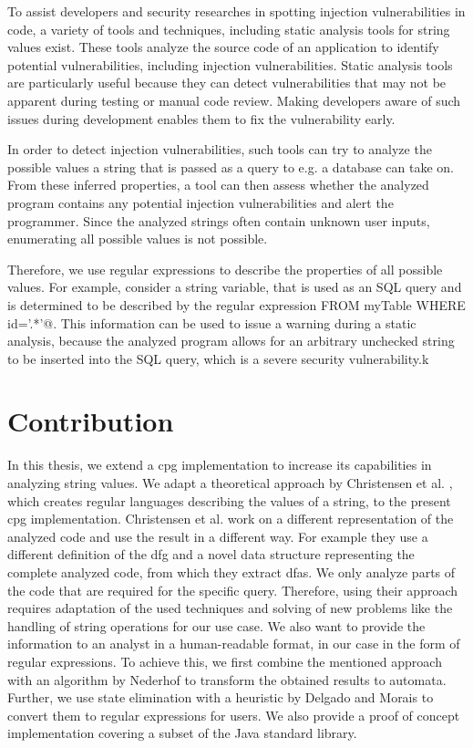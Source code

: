 To assist developers and security researches in spotting injection vulnerabilities in code, a variety of tools and techniques, including static analysis tools for string values exist. These tools analyze the source code of an application to identify potential vulnerabilities, including injection vulnerabilities. Static analysis tools are particularly useful because they can detect vulnerabilities that may not be apparent during testing or manual code review. Making developers aware of such issues during development enables them to fix the vulnerability early.

In order to detect injection vulnerabilities, such tools can try to analyze the possible values a string that is passed as a query to e.g. a database can take on.
From these inferred properties, a tool can then assess whether the analyzed program contains any potential injection vulnerabilities and alert the programmer.
Since the analyzed strings often contain unknown user inputs, enumerating all possible values is not possible. 

Therefore, we use regular expressions to describe the properties of all possible values.
For example, consider a string variable, that is used as an SQL query and is determined to be described by the regular expression \Verb@DELETE \* FROM myTable WHERE id='.*'@.
This information can be used to issue a warning during a static analysis, because the analyzed program allows for an arbitrary unchecked string to be inserted into the SQL query, which is a severe security vulnerability.k

\section{Contribution}\label{sec:intro:contribution}

In this thesis, we extend a \acf{cpg} implementation \cite{cpg} to increase its capabilities in analyzing string values. We adapt a theoretical approach by Christensen et al. \cite{brics}, which creates regular languages describing the values of a string, to the present \ac{cpg} implementation. Christensen et al. work on a different representation of the analyzed code and use the result in a different way. For example they use a different definition of the \ac{dfg} and a novel data structure representing the complete analyzed code, from which they extract \acp{dfa}. We only analyze parts of the code that are required for the specific query. Therefore, using their approach requires adaptation of the used techniques and solving of new problems like the handling of string operations for our use case. We also want to provide the information to an analyst in a human-readable format, in our case in the form of regular expressions.
To achieve this, we first combine the mentioned approach with an algorithm by Nederhof \cite{nederhof} to transform the obtained results to automata. Further, we use state elimination with a heuristic by Delgado and Morais \cite{delgado} to convert them to regular expressions for users. We also provide a proof of concept implementation covering a subset of the Java standard library.

